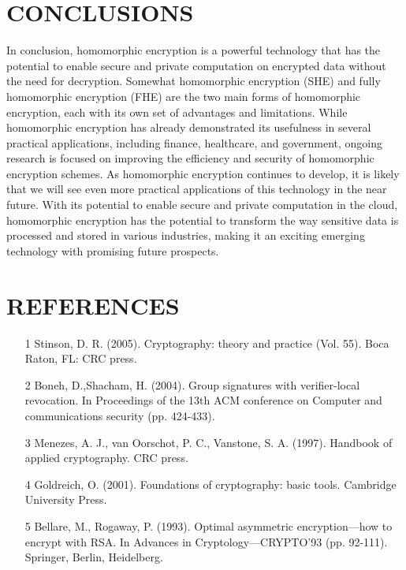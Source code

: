 \documentclass[a4paper,11pt]{report}
\begin{document}
\chapter{CONCLUSIONS}
In conclusion, homomorphic encryption is a powerful technology that has the potential to enable secure and private computation on encrypted data without the need for decryption. Somewhat homomorphic encryption (SHE) and fully homomorphic encryption (FHE) are the two main forms of homomorphic encryption, each with its own set of advantages and limitations. While homomorphic encryption has already demonstrated its usefulness in several practical applications, including finance, healthcare, and government, ongoing research is focused on improving the efficiency and security of homomorphic encryption schemes. As homomorphic encryption continues to develop, it is likely that we will see even more practical applications of this technology in the near future. With its potential to enable secure and private computation in the cloud, homomorphic encryption has the potential to transform the way sensitive data is processed and stored in various industries, making it an exciting emerging technology with promising future prospects.
\chapter{REFERENCES}

\begin{itemize}
\item[1] Stinson, D. R. (2005). Cryptography: theory and practice (Vol. 55). Boca Raton, FL: CRC press.
\item[2] Boneh, D.,Shacham, H. (2004). Group signatures with verifier-local revocation. In Proceedings of the 13th ACM conference on Computer and communications security (pp. 424-433).
\item[3] Menezes, A. J., van Oorschot, P. C.,  Vanstone, S. A. (1997). Handbook of applied cryptography. CRC press.
\item[4] Goldreich, O. (2001). Foundations of cryptography: basic tools. Cambridge University Press.
\item[5] Bellare, M., Rogaway, P. (1993). Optimal asymmetric encryption—how to encrypt with RSA. In Advances in Cryptology—CRYPTO'93 (pp. 92-111). Springer, Berlin, Heidelberg.

\vspace{12pt}
\end{itemize}
\end{document}
